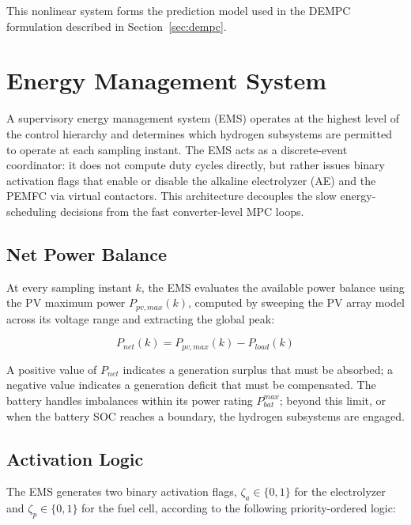 \documentclass[journal]{IEEEtran}
\begin{document}
This nonlinear system forms the prediction model used in the DEMPC
formulation described in Section~\ref{sec:dempc}.

\section{Energy Management System}
\label{sec:ems}

A supervisory energy management system (EMS) operates at the highest level
of the control hierarchy and determines which hydrogen subsystems are
permitted to operate at each sampling instant. The EMS acts as a
discrete-event coordinator: it does not compute duty cycles directly, but
rather issues binary activation flags that enable or disable the alkaline
electrolyzer (AE) and the PEMFC via virtual contactors. This architecture
decouples the slow energy-scheduling decisions from the fast converter-level
MPC loops.

\subsection{Net Power Balance}
\label{subsec:ems_pnet}

At every sampling instant $k$, the EMS evaluates the available power
balance using the PV maximum power $P_{pv,max}(k)$, computed by sweeping
the PV array model across its voltage range and extracting the global peak:

\begin{equation}
P_{net}(k) = P_{pv,max}(k) - P_{load}(k)
\label{eq:ems_pnet}
\end{equation}

A positive value of $P_{net}$ indicates a generation surplus that must be
absorbed; a negative value indicates a generation deficit that must be
compensated. The battery handles imbalances within its power rating
$P_{bat}^{max}$; beyond this limit, or when the battery SOC reaches a
boundary, the hydrogen subsystems are engaged.

\subsection{Activation Logic}
\label{subsec:ems_logic}

The EMS generates two binary activation flags,
$\zeta_a \in \{0,1\}$ for the electrolyzer and
$\zeta_p \in \{0,1\}$ for the fuel cell, according to the following
priority-ordered logic:
\end{document}

